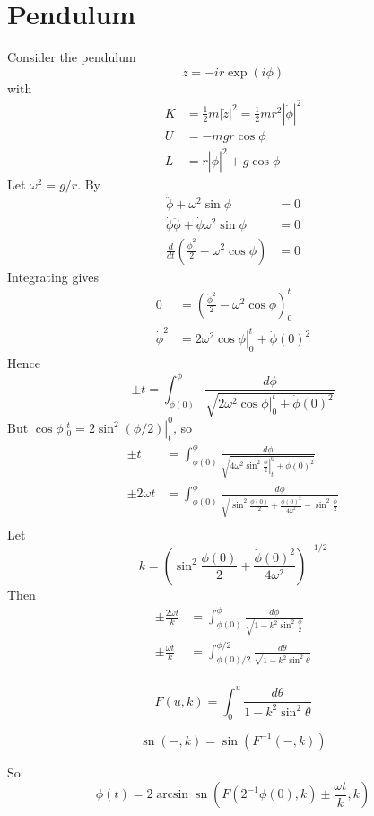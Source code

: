 \documentclass{scrbook}
\DeclareMathOperator{\sn}{sn}
\numberwithin{thms}{chapter}
\newcommand{\der}{\dot}
\newcommand{\dder}{\ddot}
\begin{document}
\section{Pendulum}
\newcommand{\ang}{\phi}
\newcommand{\scl}{\omega^2}
Consider the pendulum
\[
  z = -ir \exp(i\ang)
\]
with
\begin{align*}
  K &= \frac12 m|\der z|^2 = \frac12 mr^2|\der\ang|^2 \\
  U &= -mgr\cos \ang  \\
  L &= r|\der\ang|^2 +g\cos\ang
\end{align*}
Let $\scl=g/r$.
By 
\begin{align*}
  \dder\ang + \scl\sin\ang &=0\\
  \der\ang\dder\ang +\der\ang \scl \sin\ang &= 0 \\
  \frac d{dt} \left( \frac{\der\ang^2}2-\scl\cos\ang\right)&= 0 
\end{align*}
Integrating gives 
\begin{align*}
  0&=\left( \frac{\der\ang^2}2-\scl\cos\ang\right)_0^t \\ 
  \der\ang^2 &=\left.2\scl\cos\ang\right|_0^t+\der\ang(0)^2
\end{align*}
Hence 
\[
  \pm t=\int_{\ang(0)}^{\ang} \frac{d\ang}{\sqrt{\left.2\omega^2\cos\ang\right|_0^t+\der\ang(0)^2}}
\]
But $\cos\phi|_0^t = 2\sin^2(\phi/2)|_t^0$, so 
\begin{align*}
  \pm t&=\int_{\ang(0)}^{\ang} \frac{d\ang}{\sqrt{\left.4\omega^2\sin^2\frac\ang2\right|_t^0+\der\ang(0)^2}} \\
  \pm 2\omega t&=\int_{\ang(0)}^{\ang} \frac{d\ang}{\sqrt{\sin^2\frac{\ang(0)}2+\frac{\der\ang(0)^2}{4\omega^2}-\sin^2\frac{\ang}2}} \\
\end{align*}
Let
\[
  k=\left(\sin^2\frac{\phi(0)}2 + \frac{\der\phi(0)^2}{4\omega^2}\right)^{-1/2}
\]
Then
\begin{align*}
  \pm \frac{2\omega t}{k} &= \int_{\phi(0)}^\phi \frac{d\ang}{\sqrt{1-k^2\sin^2\frac{\ang}2}}  \\
  \pm \frac{\omega t}{k} &= \int_{\phi(0)/2}^{\phi/2} \frac{d\theta}{\sqrt{1-k^2\sin^2\theta}}  \\
\end{align*}
\begin{defn}
  \[
    F(u,k)=\int_0^u \frac{d\theta}{1-k^2\sin^2\theta}
  \]
\end{defn}
\begin{defn}[$\sn$]
  \[
    \sn(-,k)=\sin\left( F^{-1}(-,k)\right)
  \]
\end{defn}
So
\[
  \phi(t)=2\arcsin\sn\left(F\left(2^{-1}\phi(0),k\right)\pm \frac{\omega t}k,k\right)
\]
\end{document}
